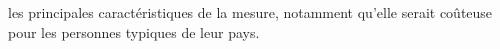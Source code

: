 les principales caractéristiques de la mesure, notamment qu'elle serait coûteuse pour les personnes typiques de leur pays. 